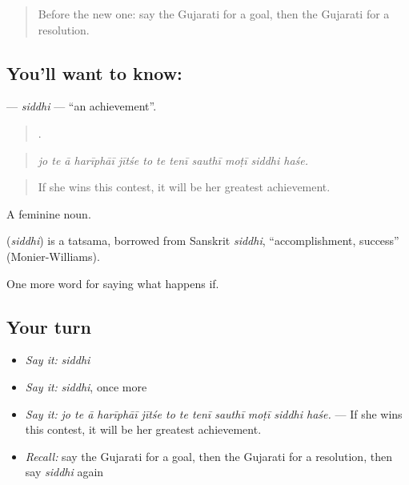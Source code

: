 \label{lesson:GU-C382-siddhi}



\begin{quote}
Before the new one: say the Gujarati for a goal, then the Gujarati for a resolution.
\end{quote}

\subsection*{You'll want to know: }
\textbf{} — \emph{siddhi} — \textquotedblleft{}an achievement\textquotedblright{}.

\begin{quote}
           .
\end{quote}

\begin{quote}
\emph{jo te ā harīphāī jītśe to te tenī sauthī moṭī siddhi haśe.}
\end{quote}

\begin{quote}
If she wins this contest, it will be her greatest achievement.
\end{quote}

A feminine noun.

\begin{cousinweb}
\textbf{} (\emph{siddhi}) is a tatsama, borrowed from Sanskrit \emph{siddhi}, \textquotedblleft{}accomplishment, success\textquotedblright{} (Monier-Williams).
\end{cousinweb}

\begin{grammarlens}[title={What you've built}]
One more word for saying what happens if.
\end{grammarlens}

\subsection*{Your turn}
\begin{itemize}
\raggedright
  \item \emph{Say it:} \emph{siddhi}
  \item \emph{Say it:} \emph{siddhi}, once more
  \item \emph{Say it:} \emph{jo te ā harīphāī jītśe to te tenī sauthī moṭī siddhi haśe.} — If she wins this contest, it will be her greatest achievement.
  \item \emph{Recall:} say the Gujarati for a goal, then the Gujarati for a resolution, then say \emph{siddhi} again
\end{itemize}

